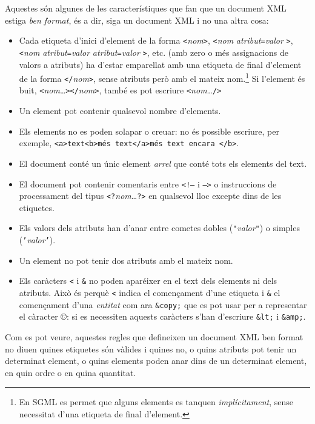 Aquestes són algunes de les característiques que fan que un document
XML estiga \emph{ben format}, és a dir, siga un document XML i no una
altra cosa:
\begin{itemize}
\item Cada etiqueta d'inici d'element de la forma
  \texttt{<}\emph{nom}\texttt{>}, \texttt{<}\emph{nom}
  \emph{atribut}\texttt{=}\emph{valor} \texttt{>},
  \texttt{<}\emph{nom} \emph{atribut}\texttt{=}\emph{valor}
  \emph{atribut}\texttt{=}\emph{valor} \texttt{>}, etc. (amb zero o
  més assignacions de valors a atributs) ha d'estar emparellat amb una
  etiqueta de final d'element de la forma
  \texttt{</}\emph{nom}\texttt{>}, sense atributs però amb el mateix
  nom.\footnote{En SGML es permet que alguns elements es tanquen
    \emph{implícitament}, sense necessitat d'una etiqueta de final
    d'element.} Si l'element és buit,
  \texttt{<}\emph{nom}\ldots\texttt{></}\emph{nom}\texttt{>}, també es
  pot escriure \texttt{<}\emph{nom}\ldots\texttt{/>}
\item Un element pot contenir qualsevol nombre d'elements.
\item Els elements no es poden solapar o creuar: no és possible
  escriure, per exemple, \texttt{<a>text<b>més text</a>més text encara
    </b>}.
\item El document conté un únic element \emph{arrel} que conté tots
  els elements del text.
\item El document pot contenir comentaris entre \texttt{<!--} i
  \texttt{-->} o instruccions de processament del tipus
  \texttt{<?}\emph{nom}\ldots\texttt{?>} en qualsevol lloc excepte dins
  de les etiquetes.
\item Els valors dels atributs han d'anar entre cometes dobles
  (\texttt{"}\emph{valor}\texttt{"}) o simples
  (\texttt{'}\emph{valor}\texttt{'}).
\item Un element no pot tenir dos atributs amb el mateix nom.
\item Els caràcters \texttt{<} i \texttt{\&} no poden aparéixer en el
  text dels elements ni dels atributs. Això és perquè \texttt{<}
  indica el començament d'une etiqueta i \texttt{\&} el començament
  d'una \emph{entitat} com ara \texttt{\&copy;} que es pot usar per a
  representar el càracter \emph{©}: si es necessiten aquests caràcters
  s'han d'escriure \texttt{\&lt;} i \texttt{\&amp;}.  
\end{itemize}
Com es pot veure, aquestes regles que defineixen un document XML ben
format no diuen quines etiquetes són vàlides i quines no, o quins
atributs pot tenir un determinat element, o quins elements poden anar
dins de un determinat element, en quin ordre o en quina
quantitat. 

